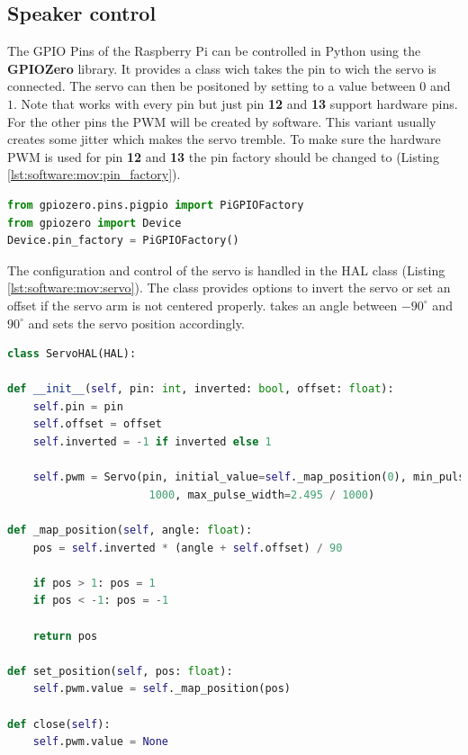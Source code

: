 \subsection{Speaker control}

The GPIO Pins of the Raspberry Pi can be controlled in Python using the \textbf{GPIOZero} library. It provides a class  wich takes the pin to wich the servo is connected. The servo can then be positoned by setting  to a value between $0$ and $1$. Note that  works with every pin but just pin \textbf{12} and \textbf{13} support hardware pins. For the other pins the PWM will be created by software. This variant usually creates some jitter which makes the servo tremble. To make sure the hardware PWM is used for pin \textbf{12} and \textbf{13} the pin factory should be changed to  (Listing \ref{lst:software:mov:pin_factory}).
%
\begin{mdframed}
\begin{lstlisting}[language=Python, caption=Changing the pin factory, label=lst:software:mov:pin_factory]
from gpiozero.pins.pigpio import PiGPIOFactory
from gpiozero import Device
Device.pin_factory = PiGPIOFactory()
\end{lstlisting}
\end{mdframed}
%
The configuration and control of the servo is handled in the HAL class  (Listing \ref{lst:software:mov:servo}). The class provides options to invert the servo or set an offset if the servo arm is not centered properly.  takes an angle between $-90^\circ$ and $90^\circ$ and sets the servo position accordingly.
%
\begin{mdframed}
\begin{lstlisting}[language=Python, caption=Servo configuration and control, label=lst:software:mov:servo]
class ServoHAL(HAL):

def __init__(self, pin: int, inverted: bool, offset: float):
    self.pin = pin
    self.offset = offset
    self.inverted = -1 if inverted else 1

    self.pwm = Servo(pin, initial_value=self._map_position(0), min_pulse_width=0.615 /
                      1000, max_pulse_width=2.495 / 1000)

def _map_position(self, angle: float):
    pos = self.inverted * (angle + self.offset) / 90

    if pos > 1: pos = 1
    if pos < -1: pos = -1

    return pos

def set_position(self, pos: float):
    self.pwm.value = self._map_position(pos)

def close(self):
    self.pwm.value = None
\end{lstlisting}
\end{mdframed}
